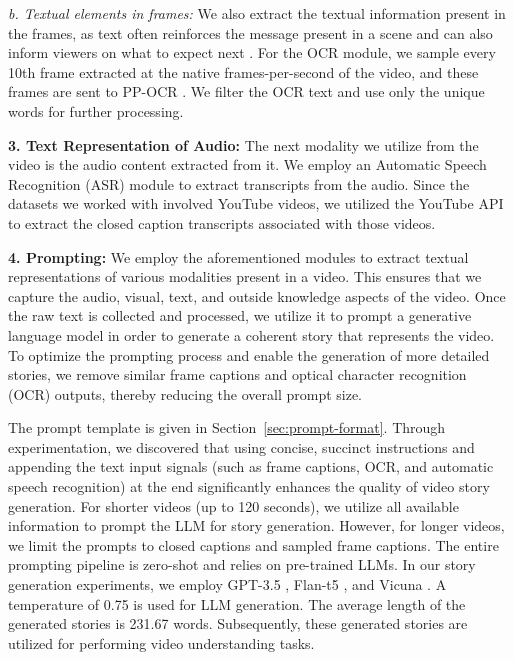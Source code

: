 \documentclass[hidelinks,11pt,a4paper]{report}
\renewcommand{\cite}[1]{\citep{#1}}
\begin{document}
\textit{b. Textual elements in frames:} We also extract the textual information present in the frames, as text often reinforces the message present in a scene and can also inform viewers on what to expect next \cite{9578608}. 
For the OCR module, we sample every 10th frame extracted at the native frames-per-second of the video, and these frames are sent to PP-OCR \cite{10.1145/2629489}. We filter the OCR text and use only the unique words for further processing.

\noindent \textbf{3. Text Representation of Audio:} The next modality we utilize from the video is the audio content extracted from it. We employ an Automatic Speech Recognition (ASR) module to extract transcripts from the audio. Since the datasets we worked with involved YouTube videos, we utilized the YouTube API to extract the closed caption transcripts associated with those videos.

\noindent \textbf{4. Prompting:} We employ the aforementioned modules to extract textual representations of various modalities present in a video. This ensures that we capture the audio, visual, text, and outside knowledge aspects of the video. Once the raw text is collected and processed, we utilize it to prompt a generative language model in order to generate a coherent story that represents the video. To optimize the prompting process and enable the generation of more detailed stories, we remove similar frame captions and optical character recognition (OCR) outputs, thereby reducing the overall prompt size. %

The prompt template is given in Section~\ref{sec:prompt-format}. Through experimentation, we discovered that using concise, succinct instructions and appending the text input signals (such as frame captions, OCR, and automatic speech recognition) at the end significantly enhances the quality of video story generation. For shorter videos (up to 120 seconds), we utilize all available information to prompt the LLM for story generation. However, for longer videos, we limit the prompts to closed captions and sampled frame captions. The entire prompting pipeline is zero-shot and relies on pre-trained LLMs. In our story generation experiments, we employ GPT-3.5 \cite{brown2020language}, Flan-t5 \cite{chung2022scaling}, and Vicuna \cite{vicuna2023}. A temperature of 0.75 is used for LLM generation. The average length of the generated stories is 231.67 words. Subsequently, these generated stories are utilized for performing video understanding tasks.
\end{document}
